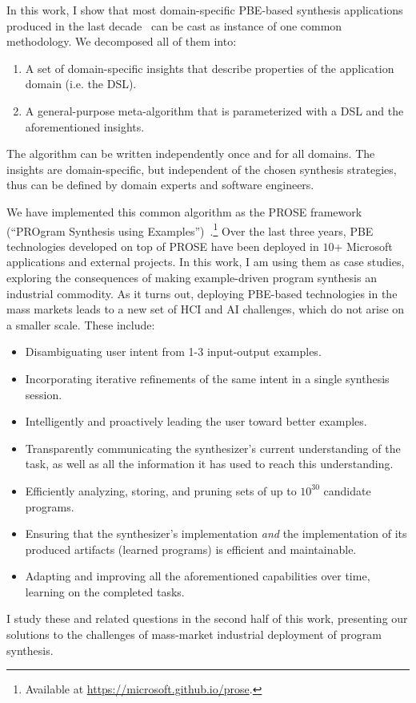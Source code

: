 In this work, I show that most domain-specific PBE-based synthesis applications produced in the last
decade~\cite{smartedit,miller:colorful,flashfill,flashextract,flashrelate,flashnormalize,vldb12:semantic,andersen:procedural,pldi15:swarat,pldi15:osera,harris2011spreadsheet,singh2012synthesizing}
can be cast as instance of one common methodology.
We decomposed all of them into:
\begin{enumerate}[nosep]
    \item A set of domain-specific insights that describe properties of the application domain (i.e. the DSL).
    \item A general-purpose meta-algorithm that is parameterized with a DSL and the aforementioned insights.
\end{enumerate}
The algorithm can be written independently once and for all domains.
The insights are domain-specific, but independent of the chosen synthesis strategies, thus can be defined by
domain experts and software engineers.

We have implemented this common algorithm as the PROSE framework (``PROgram Synthesis using
Examples'')~\cite{flashmeta}.\footnote{Available at \url{https://microsoft.github.io/prose}.}
Over the last three years, PBE technologies developed on top of PROSE have been deployed in $10$+ Microsoft applications
and external projects.
In this work, I am using them as case studies, exploring the consequences of making example-driven program synthesis an
industrial commodity.
As it turns out, deploying PBE-based technologies in the mass markets leads to a new set of HCI and AI challenges, which
do not arise on a smaller scale.
These include:
\begin{itemize}[nosep]
    \item Disambiguating user intent from 1-3 input-output examples.
    \item Incorporating iterative refinements of the same intent in a single synthesis session.
    \item Intelligently and proactively leading the user toward better examples.
    \item Transparently communicating the synthesizer's current understanding of the task, as well as all the
        information it has used to reach this understanding.
    \item Efficiently analyzing, storing, and pruning sets of up to $10^{30}$ candidate programs.
    \item Ensuring that the synthesizer's implementation \emph{and} the implementation of its produced artifacts
        (learned programs) is efficient and maintainable.
    \item Adapting and improving all the aforementioned capabilities over time, learning on the completed tasks.
\end{itemize}
I study these and related questions in the second half of this work, presenting our solutions to the challenges of
mass-market industrial deployment of program synthesis.

